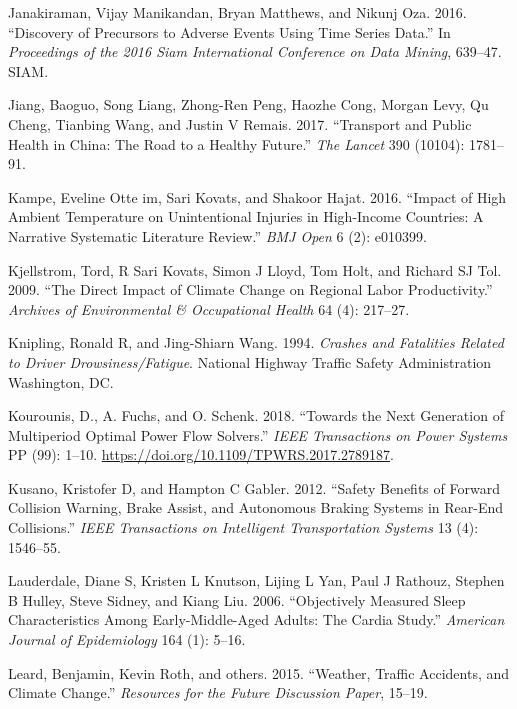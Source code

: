 \documentclass[12pt]{book}
\numberwithin{equation}{chapter}
\begin{document}
\leavevmode\hypertarget{ref-janakiraman2016discovery}{}%
Janakiraman, Vijay Manikandan, Bryan Matthews, and Nikunj Oza. 2016. ``Discovery of Precursors to Adverse Events Using Time Series Data.'' In \emph{Proceedings of the 2016 Siam International Conference on Data Mining}, 639--47. SIAM.

\leavevmode\hypertarget{ref-jiang2017transport}{}%
Jiang, Baoguo, Song Liang, Zhong-Ren Peng, Haozhe Cong, Morgan Levy, Qu Cheng, Tianbing Wang, and Justin V Remais. 2017. ``Transport and Public Health in China: The Road to a Healthy Future.'' \emph{The Lancet} 390 (10104): 1781--91.

\leavevmode\hypertarget{ref-im2016impact}{}%
Kampe, Eveline Otte im, Sari Kovats, and Shakoor Hajat. 2016. ``Impact of High Ambient Temperature on Unintentional Injuries in High-Income Countries: A Narrative Systematic Literature Review.'' \emph{BMJ Open} 6 (2): e010399.

\leavevmode\hypertarget{ref-kjellstrom2009direct}{}%
Kjellstrom, Tord, R Sari Kovats, Simon J Lloyd, Tom Holt, and Richard SJ Tol. 2009. ``The Direct Impact of Climate Change on Regional Labor Productivity.'' \emph{Archives of Environmental \& Occupational Health} 64 (4): 217--27.

\leavevmode\hypertarget{ref-knipling1994crashes}{}%
Knipling, Ronald R, and Jing-Shiarn Wang. 1994. \emph{Crashes and Fatalities Related to Driver Drowsiness/Fatigue}. National Highway Traffic Safety Administration Washington, DC.

\leavevmode\hypertarget{ref-Kourounis2018}{}%
Kourounis, D., A. Fuchs, and O. Schenk. 2018. ``Towards the Next Generation of Multiperiod Optimal Power Flow Solvers.'' \emph{IEEE Transactions on Power Systems} PP (99): 1--10. \url{https://doi.org/10.1109/TPWRS.2017.2789187}.

\leavevmode\hypertarget{ref-kusano2012safety}{}%
Kusano, Kristofer D, and Hampton C Gabler. 2012. ``Safety Benefits of Forward Collision Warning, Brake Assist, and Autonomous Braking Systems in Rear-End Collisions.'' \emph{IEEE Transactions on Intelligent Transportation Systems} 13 (4): 1546--55.

\leavevmode\hypertarget{ref-lauderdale2006objectively}{}%
Lauderdale, Diane S, Kristen L Knutson, Lijing L Yan, Paul J Rathouz, Stephen B Hulley, Steve Sidney, and Kiang Liu. 2006. ``Objectively Measured Sleep Characteristics Among Early-Middle-Aged Adults: The Cardia Study.'' \emph{American Journal of Epidemiology} 164 (1): 5--16.

\leavevmode\hypertarget{ref-leard2015weather}{}%
Leard, Benjamin, Kevin Roth, and others. 2015. ``Weather, Traffic Accidents, and Climate Change.'' \emph{Resources for the Future Discussion Paper}, 15--19.
\end{document}
